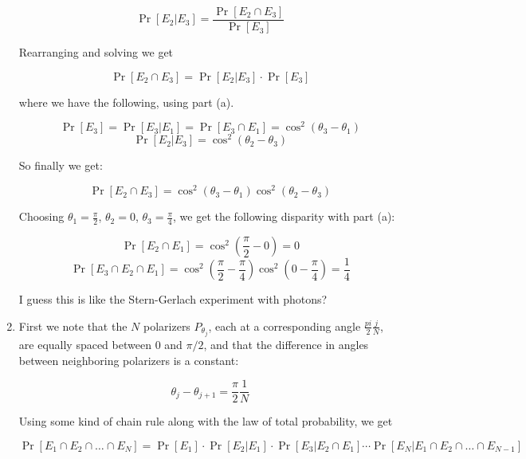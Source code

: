 \documentclass[12pt]{article}
\begin{document}
\begin{enumerate}
\begin{equation}
\Pr[E_2 | E_3] = \frac{\Pr[E_2 \cap E_3]}{\Pr[E_3]}
\end{equation}

Rearranging and solving we get

\begin{equation}
\Pr[E_2 \cap E_3] = \Pr[E_2 | E_3]\cdot \Pr[E_3]
\end{equation}

where we have the following, using part (a).

\begin{equation}
\Pr[E_3] = \Pr[E_3 | E_1] = \Pr[E_3 \cap E_1] = \cos^2(\theta_3 - \theta_1)
\end{equation}
\begin{equation}
\Pr[E_2 | E_3] = \cos^2(\theta_2 - \theta_3)
\end{equation}

So finally we get:

\begin{equation}
\Pr[E_2 \cap E_3] = \cos^2(\theta_3 - \theta_1)\cos^2(\theta_2 - \theta_3)
\end{equation}

Choosing $\theta_1 = \frac{\pi}{2}$, $\theta_2 = 0$, $\theta_3 = \frac{\pi}{4}$,
we get the following disparity with part (a):

\begin{equation}
\Pr[E_2 \cap E_1] = \cos^2(\frac{\pi}{2} - 0) = 0
\end{equation}
\begin{equation}
\Pr[E_3 \cap E_2 \cap E_1] = \cos^2(\frac{\pi}{2}-\frac{\pi}{4})\cos^2(0-\frac{\pi}{4}) = \frac{1}{4}
\end{equation}

I guess this is like the Stern-Gerlach experiment with photons?

\item
First we note that the $N$ polarizers ${P_{\theta_j}}$, each at a corresponding angle
$\frac{pi}{2}\frac{j}{N}$, are equally spaced between $0$ and $\pi/2$, and that
the difference in angles between neighboring polarizers is a constant:

\begin{equation}
\theta_j - \theta_{j+1} = \frac{\pi}{2}\frac{1}{N}
\end{equation}

Using some kind of chain rule along with the law of total probability, we get

\begin{equation}
\Pr[E_1 \cap E_2 \cap \ldots \cap E_N] = \Pr[E_1]\cdot\Pr[E_2 | E_1]\cdot
\Pr[E_3 | E_2 \cap E_1] \cdots \Pr[E_N | E_1 \cap E_2 \cap \ldots \cap E_{N-1}]
\end{equation}


\end{enumerate}
\end{document}
